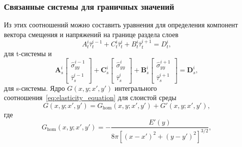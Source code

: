 \begin{frame}
    \frametitle{Связанные системы для граничных значений}
    Из этих соотношений можно составить уравнения для определения компонент вектора смещения и напряжений на границе раздела слоев
    \begin{equation}
        \label{eq:coupled_t-system}
        A_t^i \hat{\tau}_t^{i-1} + C_t^i \hat{\tau}_t^{i} + B_t^i \hat{\tau}_t^{i+1} = D_t^i,
    \end{equation}
    для t-системы и 
    \begin{equation}
        \label{eq:coupled_s-system}
        \textbf{A}_s^i \left[
            \begin{array}{c}
                \hat{\sigma}_{yy}^{i-1} \\
                \hat{\tau}_s^{i-1}
            \end{array}\right] +
        \textbf{C}_s^i \left[
            \begin{array}{c}
                \hat{\sigma}_{yy}^{i} \\
                \hat{\tau}_s^{i}
            \end{array}\right] + 
        \textbf{B}_s^i \left[
            \begin{array}{c}
                \hat{\sigma}_{yy}^{i+1} \\
                \hat{\tau}_s^{i+1}
            \end{array}\right]
        = \textbf{D}_s^i,
    \end{equation}
    для s-системы.
    Ядро $G(x,y;x',y')$ интегрального соотношения~\eqref{eq:elasticity_equation} для слоистой среды
    \begin{equation}
        G(x,y;x',y') = G_\text{hom}(x,y;x',y') + G'(x,y;x',y'),
    \end{equation} 
    где
    \begin{equation}
        \label{eq:elasticity_kernel}
        G_\text{hom}(x,y;x',y') = - \frac{E'(y)}{8\pi [(x\!-\!x')^2+(y\!-\!y')^2]^{3/2}},
    \end{equation}
\end{frame}

